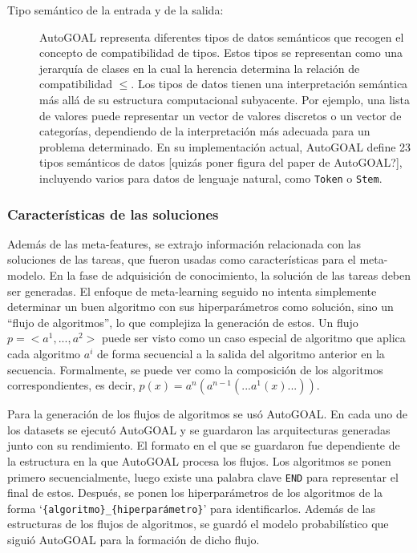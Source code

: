 \begin{itemize}
\begin{description}
		\item[Tipo semántico de la entrada y de la salida:] AutoGOAL representa diferentes tipos de datos semánticos que recogen el concepto de compatibilidad de tipos. Estos tipos se representan como una jerarquía de clases en la cual la herencia determina la relación de compatibilidad $\leq$. Los tipos de datos tienen una interpretación semántica más allá de su estructura computacional subyacente. Por ejemplo, una lista de valores puede representar un vector de valores discretos o un vector de categorías, dependiendo de la interpretación más adecuada para un problema determinado. En su implementación actual, AutoGOAL define 23 tipos semánticos de datos [quizás poner figura del paper de AutoGOAL?], incluyendo varios para datos de lenguaje natural, como \texttt{Token} o \texttt{Stem}.
	\end{description}
\end{itemize}

\subsubsection{Características de las soluciones}\label{subsub:soluciones}

Además de las meta-features, se extrajo información relacionada con las soluciones de las tareas, que fueron usadas como características para el meta-modelo. En la fase de adquisición de conocimiento, la solución de las tareas deben ser generadas. El enfoque de meta-learning seguido no intenta simplemente determinar un buen algoritmo con sus hiperparámetros como solución, sino un ``flujo de algoritmos'', lo que complejiza la generación de estos. Un flujo $p = <a^1, ..., a^2>$  puede ser visto como un caso especial de algoritmo que aplica cada algoritmo $a^i$ de forma secuencial a la salida del algoritmo anterior en la secuencia. Formalmente, se puede ver como la composición de los algoritmos correspondientes, es decir, $p(x) = a^n(a^{n-1}(...a^1(x)...))$.

Para la generación de los flujos de algoritmos se usó AutoGOAL. En cada uno de los datasets se ejecutó AutoGOAL y se guardaron las arquitecturas generadas junto con su rendimiento. El formato en el que se guardaron fue dependiente de la estructura en la que AutoGOAL procesa los flujos. Los algoritmos se ponen primero secuencialmente, luego existe una palabra clave \texttt{END} para representar el final de estos. Después, se ponen los hiperparámetros de los algoritmos de la forma  `\texttt{\{algoritmo\}\_\{hiperparámetro\}}' para identificarlos. Además de las estructuras de los flujos de algoritmos, se guardó el modelo probabilístico que siguió AutoGOAL para la formación de dicho flujo.

